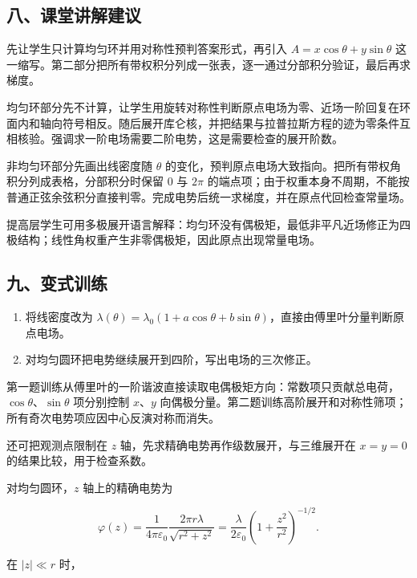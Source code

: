 \documentclass[12pt,a4paper,UTF8]{ctexart}
\newcommand{\tightlist}{\setlength{\itemsep}{0pt}\setlength{\parskip}{0pt}}
\begin{document}
\subsection{八、课堂讲解建议}\label{ux516bux8bfeux5802ux8bb2ux89e3ux5efaux8bae-2}

先让学生只计算均匀环并用对称性预判答案形式，再引入
\(A=x\cos\theta+y\sin\theta\)
这一缩写。第二部分把所有带权积分列成一张表，逐一通过分部积分验证，最后再求梯度。

均匀环部分先不计算，让学生用旋转对称性判断原点电场为零、近场一阶回复在环面内和轴向符号相反。随后展开库仑核，并把结果与拉普拉斯方程的迹为零条件互相核验。强调求一阶电场需要二阶电势，这是需要检查的展开阶数。

非均匀环部分先画出线密度随 \(\theta\)
的变化，预判原点电场大致指向。把所有带权角积分列成表格，分部积分时保留
\(0\) 与 \(2\pi\)
的端点项；由于权重本身不周期，不能按普通正弦余弦积分直接判零。完成电势后统一求梯度，并在原点代回检查常量场。

提高层学生可用多极展开语言解释：均匀环没有偶极矩，最低非平凡近场修正为四极结构；线性角权重产生非零偶极矩，因此原点出现常量电场。

\subsection{九、变式训练}\label{ux4e5dux53d8ux5f0fux8badux7ec3-2}

\begin{enumerate}
\def\labelenumi{\arabic{enumi}.}
\tightlist
\item
  将线密度改为
  \(\lambda(\theta)=\lambda_0(1+a\cos\theta+b\sin\theta)\)，直接由傅里叶分量判断原点电场。
\item
  对均匀圆环把电势继续展开到四阶，写出电场的三次修正。
\end{enumerate}

第一题训练从傅里叶的一阶谐波直接读取电偶极矩方向：常数项只贡献总电荷，\(\cos\theta\)、\(\sin\theta\)
项分别控制 \(x\)、\(y\)
向偶极分量。第二题训练高阶展开和对称性筛项；所有奇次电势项应因中心反演对称而消失。

还可把观测点限制在 \(z\) 轴，先求精确电势再作级数展开，与三维展开在
\(x=y=0\) 的结果比较，用于检查系数。

对均匀圆环，\(z\) 轴上的精确电势为

\[\varphi(z)=\frac{1}{4\pi\varepsilon_0}
\frac{2\pi r\lambda}{\sqrt{r^2+z^2}}
=\frac{\lambda}{2\varepsilon_0}
\left(1+\frac{z^2}{r^2}\right)^{-1/2}.\]

在 \(|z|\ll r\) 时，
\end{document}
